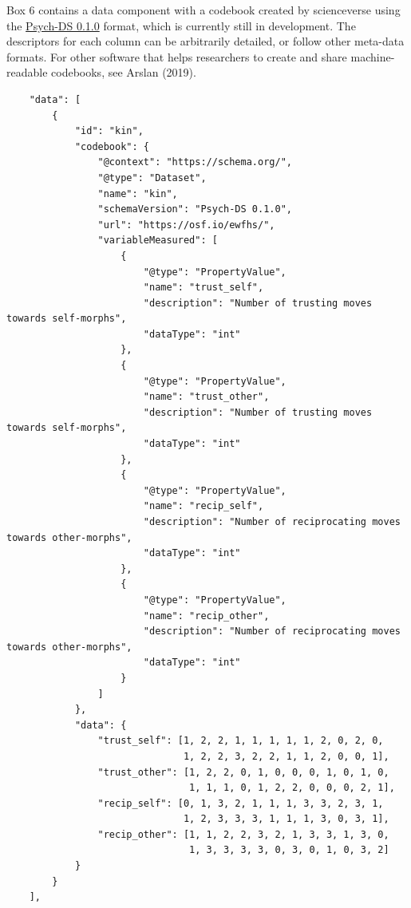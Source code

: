 \documentclass[
  english,
  doc,floatsintext]{apa6}
\begin{document}
Box 6 contains a data component with a codebook created by scienceverse using the \href{https://docs.google.com/document/d/1u8o5jnWk0Iqp_J06PTu5NjBfVsdoPbBhstht6W0fFp0/edit\#heading=h.caxnnxqaobj}{Psych-DS 0.1.0} format, which is currently still in development. The descriptors for each column can be arbitrarily detailed, or follow other meta-data formats. For other software that helps researchers to create and share machine-readable codebooks, see Arslan (2019).

\begin{tcolorbox}[colback=black!5!white,colframe=white!5!black,title=Box 6. The data component.]
\begin{verbatim}
    "data": [
        {
            "id": "kin",
            "codebook": {
                "@context": "https://schema.org/",
                "@type": "Dataset",
                "name": "kin",
                "schemaVersion": "Psych-DS 0.1.0",
                "url": "https://osf.io/ewfhs/",
                "variableMeasured": [
                    {
                        "@type": "PropertyValue",
                        "name": "trust_self",
                        "description": "Number of trusting moves towards self-morphs",
                        "dataType": "int"
                    },
                    {
                        "@type": "PropertyValue",
                        "name": "trust_other",
                        "description": "Number of trusting moves towards self-morphs",
                        "dataType": "int"
                    },
                    {
                        "@type": "PropertyValue",
                        "name": "recip_self",
                        "description": "Number of reciprocating moves towards other-morphs",
                        "dataType": "int"
                    },
                    {
                        "@type": "PropertyValue",
                        "name": "recip_other",
                        "description": "Number of reciprocating moves towards other-morphs",
                        "dataType": "int"
                    }
                ]
            },
            "data": {
                "trust_self": [1, 2, 2, 1, 1, 1, 1, 1, 2, 0, 2, 0, 
                               1, 2, 2, 3, 2, 2, 1, 1, 2, 0, 0, 1],
                "trust_other": [1, 2, 2, 0, 1, 0, 0, 0, 1, 0, 1, 0, 
                                1, 1, 1, 0, 1, 2, 2, 0, 0, 0, 2, 1],
                "recip_self": [0, 1, 3, 2, 1, 1, 1, 3, 3, 2, 3, 1, 
                               1, 2, 3, 3, 3, 1, 1, 1, 3, 0, 3, 1],
                "recip_other": [1, 1, 2, 2, 3, 2, 1, 3, 3, 1, 3, 0, 
                                1, 3, 3, 3, 3, 0, 3, 0, 1, 0, 3, 2]
            }
        }
    ],
\end{verbatim}
\end{tcolorbox}
\end{document}
